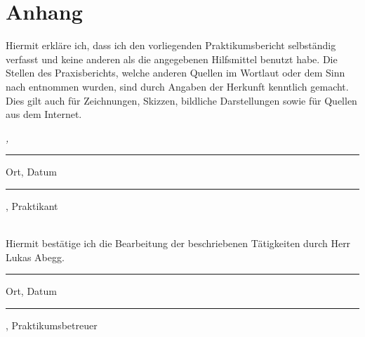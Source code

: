 %
\chapter*{Anhang}
\label{sec:anhang}
\thispagestyle{empty}

Hiermit erkläre ich, dass ich den vorliegenden Praktikumsbericht selbständig verfasst und keine anderen als die angegebenen Hilfsmittel benutzt habe.
Die Stellen des Praxisberichts, welche anderen Quellen im Wortlaut oder dem Sinn nach entnommen wurden, sind durch Angaben der Herkunft kenntlich gemacht.
Dies gilt auch für Zeichnungen, Skizzen, bildliche Darstellungen sowie für Quellen aus dem Internet.\\[2mm]

\bigskip

\noindent\textit{\thesisUniversityCity, \thesisDate}

\begin{minipage}{5cm}
		\rule{\textwidth}{0.5pt}
		Ort, Datum
\end{minipage}
\begin{minipage}{9cm}
		\rule{\textwidth}{0.5pt}
		\thesisName, Praktikant
\end{minipage}\\[2cm]

Hiermit bestätige ich die Bearbeitung der beschriebenen Tätigkeiten durch Herr Lukas Abegg.\\[2mm]

\bigskip

\begin{minipage}{5cm}
		\rule{\textwidth}{0.5pt}
		Ort, Datum
\end{minipage}
\begin{minipage}{9cm}
		\rule{\textwidth}{0.5pt}
		\thesisSecondReviewer, Praktikumsbetreuer
\end{minipage}


